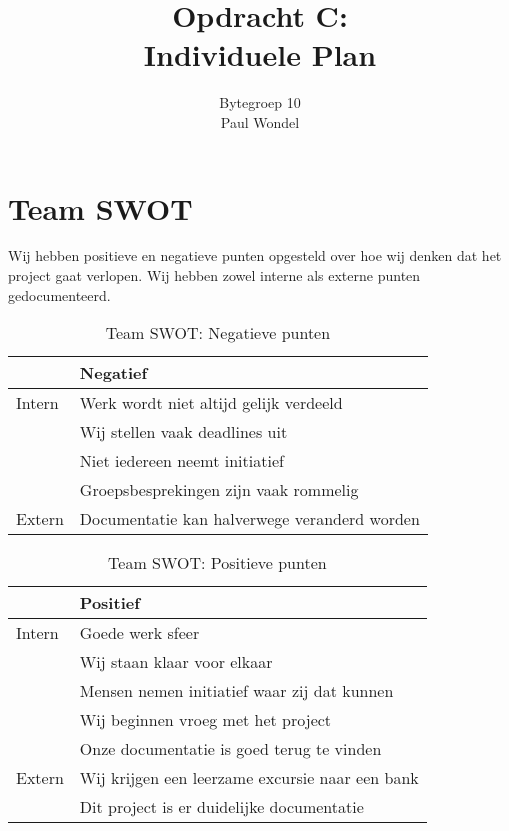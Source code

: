 \documentclass{article}
\title{Opdracht C:\\
	Individuele Plan}
\author{Bytegroep 10\\
	Paul Wondel}
\begin{document}
\maketitle
\newpage

\tableofcontents

\newpage

\section{Team SWOT}

Wij hebben positieve en negatieve punten opgesteld over hoe wij denken dat het project gaat verlopen.
Wij hebben zowel interne als externe punten gedocumenteerd.

\vspace{5mm}

\begin{table}[h!]
\caption{Team SWOT: Negatieve punten}
\label{tab: Negatieve punten}
\begin{tabular}{l|l}
        & \textbf{Negatief}\\
        \hline
        {Intern} 	& Werk wordt niet altijd gelijk verdeeld \\
			& Wij stellen vaak deadlines uit \\
			& Niet iedereen neemt initiatief \\
			& Groepsbesprekingen zijn vaak rommelig \\
	\hline
        {Extern}	& Documentatie kan halverwege veranderd worden\\
\end{tabular}
\end{table}

\begin{table}[h!]
\caption{Team SWOT: Positieve punten}
\label{tab: Positieve punten}
\begin{tabular}{l|l}
        & \textbf{Positief} \\
        \hline
        {Intern} 	& Goede werk sfeer \\ 
			& Wij staan klaar voor elkaar \\
			& Mensen nemen initiatief waar zij dat kunnen \\
			& Wij beginnen vroeg met het project \\
			& Onze documentatie is goed terug te vinden \\
	\hline
        {Extern}	& Wij krijgen een leerzame excursie naar een bank \\
			& Dit project is er duidelijke documentatie \\	
\end{tabular}
\end{table}
\end{document}
